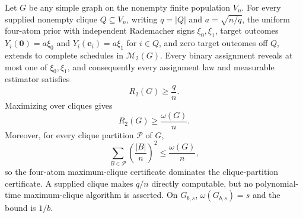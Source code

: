 Let \(G\) be any simple graph on the nonempty finite population \(V_n\).  For every supplied nonempty clique \(Q\subseteq V_n\), writing \(q=|Q|\) and \(a=\sqrt{n/q}\), the uniform four-atom prior with independent Rademacher signs \(\xi_0,\xi_1\), target outcomes \(Y_i(\mathbf 0)=a\xi_0\) and \(Y_i(\mathbf e_i)=a\xi_1\) for \(i\in Q\), and zero target outcomes off \(Q\), extends to complete schedules in \(\mathcal M_2(G)\).  Every binary assignment reveals at most one of \(\xi_0,\xi_1\), and consequently every assignment law and measurable estimator satisfies
\[
R_2(G)\geq \frac{q}{n}.
\]
Maximizing over cliques gives
\[
R_2(G)\geq\frac{\omega(G)}{n}.
\]
Moreover, for every clique partition \(\mathcal P\) of \(G\),
\[
\sum_{B\in\mathcal P}\left(\frac{|B|}{n}\right)^2
\leq \frac{\omega(G)}{n},
\]
so the four-atom maximum-clique certificate dominates the clique-partition certificate.  A supplied clique makes \(q/n\) directly computable, but no polynomial-time maximum-clique algorithm is asserted.  On \(G_{b,s}\), \(\omega(G_{b,s})=s\) and the bound is \(1/b\).